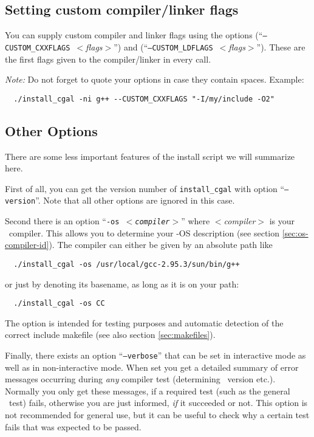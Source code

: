 \subsection{Setting custom compiler/linker flags}\label{sec:custom-setup}

You can supply custom compiler and linker flags using the options
\mbox{(``\texttt{--CUSTOM\_CXXFLAGS}
  \textit{$<$flags$>$}'')} and
\mbox{(``\texttt{--CUSTOM\_LDFLAGS}
  \textit{$<$flags$>$}'')}.  These are the
first flags given to the compiler/linker in every call.

\textit{Note:} Do not forget to quote your options in case they
contain spaces. Example:
\begin{verbatim}
  ./install_cgal -ni g++ --CUSTOM_CXXFLAGS "-I/my/include -O2"
\end{verbatim}

\subsection{Other Options}\label{sec:other-options}

There are some less important features of the install script we will
summarize here.

First of all, you can get the version number of \texttt{install\_cgal}
with option ``\texttt{--version}''. Note that all other options are
ignored in this case.

Second there is an option ``\texttt{-os \textit{$<$compiler$>$}}''
where \textit{$<$compiler$>$} is your \CC\ compiler. This allows you
to determine your \cgal-OS description (see section
\ref{sec:os-compiler-id}). The compiler can either be given by an
absolute path like
\begin{verbatim}
  ./install_cgal -os /usr/local/gcc-2.95.3/sun/bin/g++
\end{verbatim}
or just by denoting its basename, as long as it is on your path:
\begin{verbatim}
  ./install_cgal -os CC
\end{verbatim}
The option is intended for testing purposes and automatic detection of
the correct include makefile (see also section \ref{sec:makefiles}).

Finally, there exists an option
``\texttt{--verbose}'' that
can be set in interactive mode as well as in non-interactive mode.
When set you get a detailed summary of error messages occurring during
\textit{any} compiler test (determining \stl\ version etc.). Normally
you only get these messages, if a required test (such as the general
\stl\ test) fails, otherwise you are just informed, \textit{if} it
succeeded or not.  This option is not recommended for general use, but
it can be useful to check why a certain test fails that was expected
to be passed.

